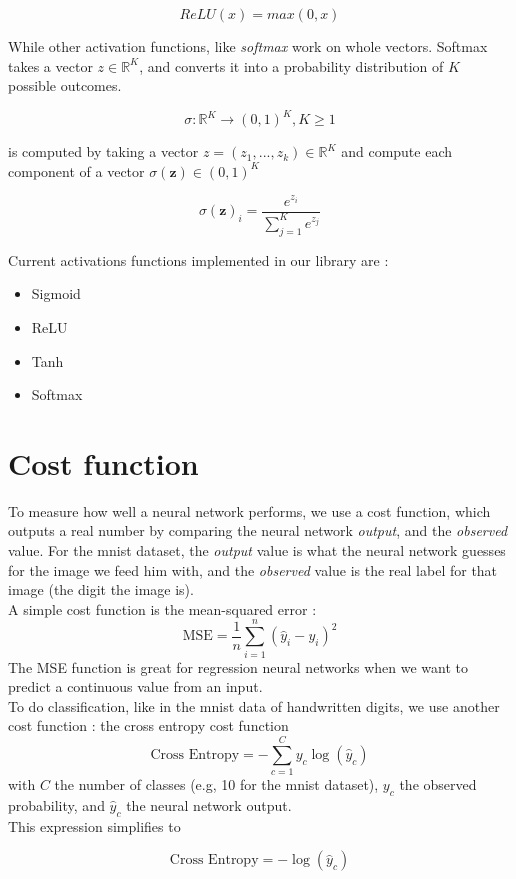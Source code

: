 \documentclass[a4paper, twocolumn, twoside]{article}
\begin{document}
	$$
	ReLU(x) = max(0, x)
	$$

	While other activation functions, like \textit{softmax} work on whole vectors.
	Softmax takes a vector $z \in \mathbb{R}^K$,
	and converts it into a probability distribution of $K$ possible outcomes.

	$$
	\sigma : \mathbb{R}^{K} \rightarrow (0, 1)^K, K \geq 1
	$$

	is computed by taking a vector $z = (z_1, ..., z_k) \in \mathbb{R}^K$ and compute each component of a vector $\sigma(\mathbf{z}) \in (0, 1)^K$ 

	$$
	\sigma(\mathbf{z})_i = \frac{e^{z_i}}{\sum_{j = 1}^{K} e^{z_j}}
	$$

	Current activations functions implemented in our library are :
	\begin{itemize}
		\item{Sigmoid}
		\item{ReLU}
		\item{Tanh}
		\item{Softmax}
	\end{itemize}

	\section{Cost function}
	To measure how well a neural network performs, we use a cost function, 
	which outputs a real number
	by comparing the neural network \textit{output}, 
	and the \textit{observed} value. For the mnist dataset, the \textit{output} value is what the neural network guesses for the image we feed him with, and the \textit{observed} value is the real label for that image (the digit the image is).\\
	A simple cost function is the mean-squared error :
	$$
	\text{MSE} = \frac{1}{n} \sum_{i=1}^{n} (\hat{y}_i - y_i)^2
	$$
	The MSE function is great for regression neural networks when we want to predict a continuous value from an input.\\
	To do classification, like in the mnist data of handwritten digits,
	we use another cost function :
	the cross entropy cost function
	$$
		\text{Cross Entropy} = -\sum_{c=1}^{C} y_{c} \log(\hat{y}_{c})
	$$
	with $C$ the number of classes (e.g, 10 for the mnist dataset), $y_{c}$ 
	the observed probability, and $\hat{y}_{c}$ the neural network output.\\
	This expression simplifies to

	$$
		\text{Cross Entropy} = -\log(\hat{y}_{c})
	$$
\end{document}
